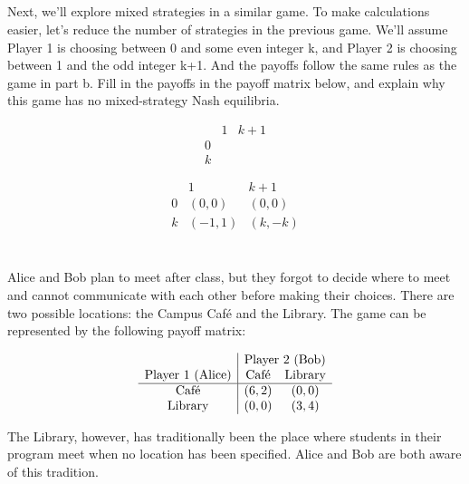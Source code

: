 \documentclass[newpages]{assignment}
\begin{document}
\subsection{}

\begin{problem}
    Next, we'll explore mixed strategies in a similar game. To make calculations easier, let's reduce the number of strategies in the previous game. We'll assume Player 1 is choosing between 0 and some even integer k, and Player 2 is choosing between 1 and the odd integer k+1. And the payoffs follow the same rules as the game in part b. Fill in the payoffs in the payoff matrix below, and explain why this game has no mixed-strategy Nash equilibria.

    \[
        \begin{array}{c|cc}
              & 1 & k + 1 \\
            \hline
            0 &   &       \\
            k &   &
        \end{array}
    \]
\end{problem}

\begin{solution}
    \[
        \begin{array}{c|cc}
              & 1      & k+1    \\
            \hline
            0 & (0,0)  & (0,0)  \\
            k & (-1,1) & (k,-k)
        \end{array}
    \]
\end{solution}

\section{}

\begin{problem}
    Alice and Bob plan to meet after class, but they forgot to decide where to meet and cannot communicate with each other before making their choices. There are two possible locations: the Campus Café and the Library. The game can be represented by the following payoff matrix:

    \[
        \begin{array}{c|cc}
                                    & \multicolumn{2}{c}{\text{Player 2 (Bob)}}                  \\
            \text{Player 1 (Alice)} & \text{Café}                               & \text{Library} \\
            \hline
            \text{Café}             & (6, 2)                                    & (0, 0)         \\
            \text{Library}          & (0, 0)                                    & (3, 4)
        \end{array}
    \]

    The Library, however, has traditionally been the place where students in their program meet when no location has been specified. Alice and Bob are both aware of this tradition.
\end{problem}
\end{document}
